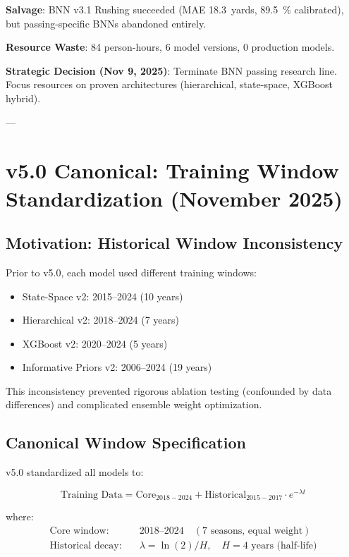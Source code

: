 \textbf{Salvage}: BNN v3.1 Rushing succeeded (MAE \SI{18.3}{yards}, \SI{89.5}{\percent} calibrated), but passing-specific BNNs abandoned entirely.

\textbf{Resource Waste}: 84 person-hours, 6 model versions, 0 production models.

\textbf{Strategic Decision (Nov 9, 2025)}: Terminate BNN passing research line. Focus resources on proven architectures (hierarchical, state-space, XGBoost hybrid).

---

\section{v5.0 Canonical: Training Window Standardization (November 2025)}

\subsection{Motivation: Historical Window Inconsistency}

Prior to v5.0, each model used different training windows:

\begin{itemize}
\item State-Space v2: 2015--2024 (10 years)
\item Hierarchical v2: 2018--2024 (7 years)
\item XGBoost v2: 2020--2024 (5 years)
\item Informative Priors v2: 2006--2024 (19 years)
\end{itemize}

This inconsistency prevented rigorous ablation testing (confounded by data differences) and complicated ensemble weight optimization.

\subsection{Canonical Window Specification}

v5.0 standardized all models to:

\begin{equation}
\text{Training Data} = \text{Core}_{2018-2024} + \text{Historical}_{2015-2017} \cdot e^{-\lambda t}
\label{eq:canonical-window}
\end{equation}

where:
\begin{align}
\text{Core window:} & \quad 2018\text{--}2024 \quad (7 \text{ seasons, equal weight}) \\
\text{Historical decay:} & \quad \lambda = \ln(2) / H, \quad H = 4 \text{ years (half-life)}
\end{align}

